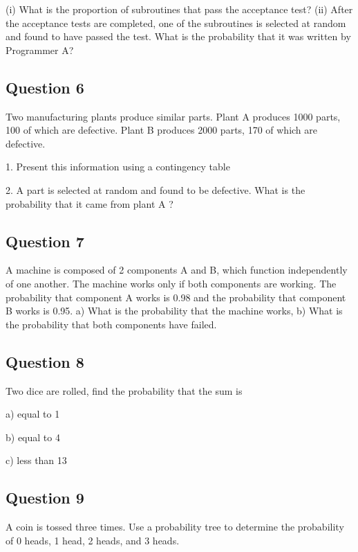 \begin{frame}

(i) What is the proportion of subroutines that pass the acceptance test?
(ii) After the acceptance tests are completed, one of the subroutines is selected at random and found to have passed the test. What is the probability that it was written by Programmer A?




\end{frame}
\begin{frame}
\subsection{Question 6}
Two manufacturing plants produce similar parts. Plant A produces 1000 parts, 100 of which are defective. Plant B produces 2000 parts, 170 of which are defective. 

1.	Present this information using a contingency table

2.	A part is selected at random and found to be defective. What is the probability that it came from plant A ?
\subsection{Question 7}
A machine is composed of 2 components A and B, which function independently of one another. The machine works only if both components are working. The probability that component A works is 0.98 and the probability that component B works is 0.95.
a)	What is the probability that the machine works, 
b)	What is the probability that both components have failed.
 
\subsection{Question 8} 
Two dice are rolled, find the probability that the sum is 

a) equal to 1 

b) equal to 4 

c) less than 13

\subsection{Question 9}
A coin is tossed three times. Use a probability tree to determine the probability of 0 heads, 1 head, 2 heads, and 3 heads.








\end{frame}
